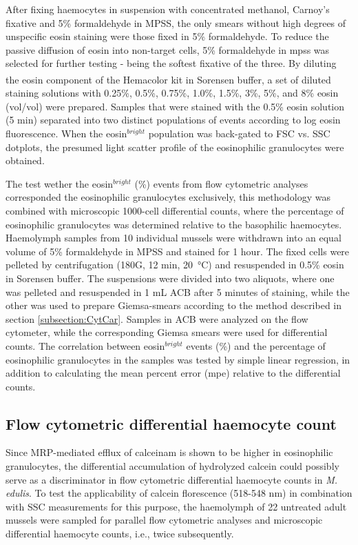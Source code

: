After fixing haemocytes in suspension with concentrated methanol, Carnoy’s fixative and 5\% formaldehyde in MPSS, the only smears without high degrees of unspecific eosin staining were those fixed in 5\% formaldehyde. To reduce the passive diffusion of eosin into non-target cells, 5\% formaldehyde in \acrshort{mpss} was selected for further testing - being the softest fixative of the three. By diluting the eosin component of the Hemacolor\textsuperscript{\textregistered} kit in Sorensen buffer, a set of diluted staining solutions with 0.25\%, 0.5\%, 0.75\%, 1.0\%, 1.5\%, 3\%, 5\%, and 8\% eosin (vol/vol) were prepared. Samples that were stained with the 0.5\% eosin solution (5 min) separated into two distinct populations of events according to log eosin fluorescence. When the eosin$^{bright}$ population was back-gated to FSC vs. SSC dotplots, the presumed light scatter profile of the eosinophilic granulocytes were obtained.

The test wether the eosin$^{bright}$ (\%) events from flow cytometric analyses corresponded the eosinophilic granulocytes exclusively, this methodology was combined with microscopic 1000-cell differential counts, where the percentage of eosinophilic granulocytes was determined relative to the basophilic haemocytes. Haemolymph samples from 10 individual mussels were withdrawn into an equal volume of 5\% formaldehyde in MPSS and stained for 1 hour. The fixed cells were pelleted by centrifugation (180G, 12 min, \SI{20}{\celsius}) and resuspended in 0.5\% eosin in Sorensen buffer. The suspensions were divided into two aliquots, where one was pelleted and resuspended in 1 mL ACB after 5 minutes of staining, while the other was used to prepare Giemsa-smears according to the method described in section \ref{subsection:CytCar}. Samples in ACB were analyzed on the flow cytometer, while the corresponding Giemsa smears were used for differential counts. The correlation between eosin$^{bright}$ events (\%) and the percentage of eosinophilic granulocytes in the samples was tested by simple linear regression, in addition to calculating the mean percent error (\acrshort{mpe}) relative to the differential counts.

\subsection{Flow cytometric differential haemocyte count}
Since MRP-mediated efflux of \acrshort{calceinam} is shown to be higher in eosinophilic granulocytes, the differential accumulation of hydrolyzed calcein could possibly serve as a discriminator in flow cytometric differential haemocyte counts in \emph{M. edulis}. To test the applicability of calcein florescence (518-548 nm) in combination with SSC measurements for this purpose, the haemolymph of 22 untreated adult mussels were sampled for parallel flow cytometric analyses and microscopic differential haemocyte counts, i.e., twice subsequently.

